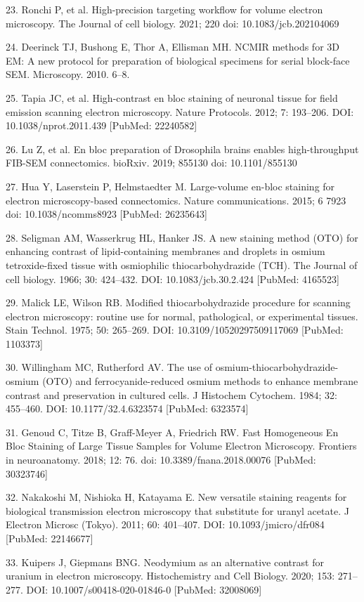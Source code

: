 \documentclass{article}
\begin{document}
\begin{hangpars}
23. Ronchi P, et al. High-precision targeting workflow for volume electron microscopy. The Journal of cell biology. 2021; 220 doi: 10.1083/jcb.202104069

24. Deerinck TJ, Bushong E, Thor A, Ellisman MH. NCMIR methods for 3D EM: A new protocol for preparation of biological specimens for serial block-face SEM. Microscopy. 2010. 6–8.

25. Tapia JC, et al. High-contrast en bloc staining of neuronal tissue for field emission scanning electron microscopy. Nature Protocols. 2012; 7: 193–206. DOI: 10.1038/nprot.2011.439 [PubMed: 22240582]

26. Lu Z, et al. En bloc preparation of Drosophila brains enables high-throughput FIB-SEM connectomics. bioRxiv. 2019; 855130 doi: 10.1101/855130

27. Hua Y, Laserstein P, Helmstaedter M. Large-volume en-bloc staining for electron microscopy-based connectomics. Nature communications. 2015; 6 7923 doi: 10.1038/ncomms8923 [PubMed: 26235643]

28. Seligman AM, Wasserkrug HL, Hanker JS. A new staining method (OTO) for enhancing contrast of lipid-containing membranes and droplets in osmium tetroxide-fixed tissue with osmiophilic thiocarbohydrazide (TCH). The Journal of cell biology. 1966; 30: 424–432. DOI: 10.1083/jcb.30.2.424 [PubMed: 4165523]

29. Malick LE, Wilson RB. Modified thiocarbohydrazide procedure for scanning electron microscopy: routine use for normal, pathological, or experimental tissues. Stain Technol. 1975; 50: 265–269. DOI: 10.3109/10520297509117069 [PubMed: 1103373]

30. Willingham MC, Rutherford AV. The use of osmium-thiocarbohydrazide-osmium (OTO) and ferrocyanide-reduced osmium methods to enhance membrane contrast and preservation in cultured cells. J Histochem Cytochem. 1984; 32: 455–460. DOI: 10.1177/32.4.6323574 [PubMed: 6323574]

31. Genoud C, Titze B, Graff-Meyer A, Friedrich RW. Fast Homogeneous En Bloc Staining of Large Tissue Samples for Volume Electron Microscopy. Frontiers in neuroanatomy. 2018; 12: 76. doi: 10.3389/fnana.2018.00076 [PubMed: 30323746]

32. Nakakoshi M, Nishioka H, Katayama E. New versatile staining reagents for biological transmission electron microscopy that substitute for uranyl acetate. J Electron Microsc (Tokyo). 2011; 60: 401–407. DOI: 10.1093/jmicro/dfr084 [PubMed: 22146677]

33. Kuipers J, Giepmans BNG. Neodymium as an alternative contrast for uranium in electron microscopy. Histochemistry and Cell Biology. 2020; 153: 271–277. DOI: 10.1007/s00418-020-01846-0 [PubMed: 32008069]


\end{hangpars}
\end{document}
